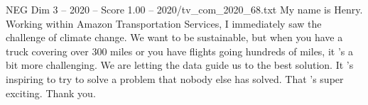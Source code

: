 \begin{textsample}{NEG Dim 3 – 2020 – Score 1.00 – 2020/tv\_com\_2020\_68.txt}  \label{ex:f3_neg_039}
My name is Henry.
Working within Amazon Transportation Services, I immediately saw the challenge of climate change.
We want to be sustainable, but when you have a truck covering over 300 miles or you have flights going hundreds of miles, it 's a bit more challenging.
We are letting the data guide us to the best solution.
It 's inspiring to try to solve a problem that nobody else has solved.
That 's super exciting.
Thank you.

\end{textsample}
